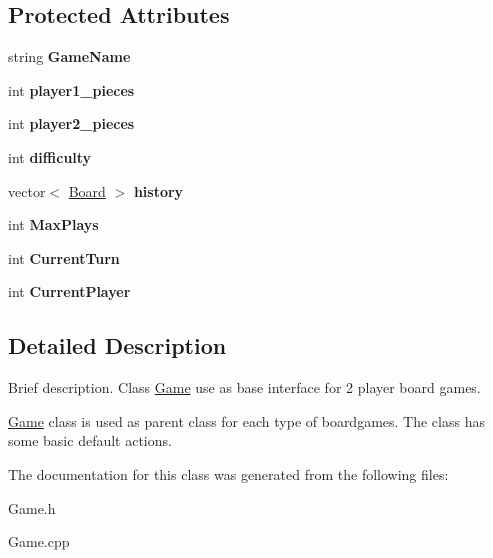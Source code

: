 \subsection*{Protected Attributes}
\begin{DoxyCompactItemize}
\item 
\hypertarget{class_game_a1b56d5db37d900da0911378cc01f4cad}{string {\bfseries Game\-Name}}\label{class_game_a1b56d5db37d900da0911378cc01f4cad}

\item 
\hypertarget{class_game_aea2c7f8bdb891f32026750c81f6eac16}{int {\bfseries player1\-\_\-pieces}}\label{class_game_aea2c7f8bdb891f32026750c81f6eac16}

\item 
\hypertarget{class_game_a2b82ab082220d93bab2d7d1d181ad639}{int {\bfseries player2\-\_\-pieces}}\label{class_game_a2b82ab082220d93bab2d7d1d181ad639}

\item 
\hypertarget{class_game_a536a6390d16f05d402928bd731e06ef3}{int {\bfseries difficulty}}\label{class_game_a536a6390d16f05d402928bd731e06ef3}

\item 
\hypertarget{class_game_a7c0dd74fa2e5c366638596b7e82428f1}{vector$<$ \hyperlink{class_board}{Board} $>$ {\bfseries history}}\label{class_game_a7c0dd74fa2e5c366638596b7e82428f1}

\item 
\hypertarget{class_game_a53cb9be6604469db6b3abac24c5a2ab6}{int {\bfseries Max\-Plays}}\label{class_game_a53cb9be6604469db6b3abac24c5a2ab6}

\item 
\hypertarget{class_game_a88700a4643e08b12130ba2950c54ed8b}{int {\bfseries Current\-Turn}}\label{class_game_a88700a4643e08b12130ba2950c54ed8b}

\item 
\hypertarget{class_game_a661282d67a0e4a972293c98478bc02e4}{int {\bfseries Current\-Player}}\label{class_game_a661282d67a0e4a972293c98478bc02e4}

\end{DoxyCompactItemize}


\subsection{Detailed Description}
Brief description. Class \hyperlink{class_game}{Game} use as base interface for 2 player board games. 

\hyperlink{class_game}{Game} class is used as parent class for each type of boardgames. The class has some basic default actions. 

The documentation for this class was generated from the following files\-:\begin{DoxyCompactItemize}
\item 
Game.\-h\item 
Game.\-cpp\end{DoxyCompactItemize}

